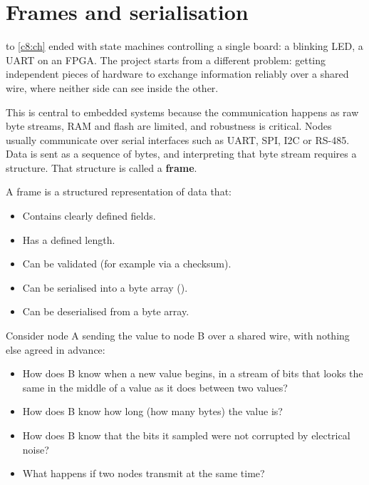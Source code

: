 
\section{Frames and serialisation}
\label{c10:sec:framing}

 to \ref{c8:ch} ended with state machines controlling a single board: a blinking LED,
a UART on an FPGA. The project starts from a different problem: getting independent pieces of
hardware to exchange information reliably over a shared wire, where neither side can see inside the
other.

This is central to embedded systems because the communication happens as raw byte streams, RAM and
flash are limited, and robustness is critical. Nodes usually communicate over serial interfaces such
as UART, SPI, I2C or RS-485. Data is sent as a sequence of bytes, and interpreting that byte stream
requires a structure. That structure is called a \textbf{frame}.

A frame is a structured representation of data that:
\begin{itemize}
  \item Contains clearly defined fields.
  \item Has a defined length.
  \item Can be validated (for example via a checksum).
  \item Can be serialised into a byte array ().
  \item Can be deserialised from a byte array.
\end{itemize}

Consider node A sending the value  to node B over a shared wire, with nothing else agreed
in advance:
\begin{itemize}
  \item How does B know when a new value begins, in a stream of bits that looks the same in the
    middle of a value as it does between two values?
  \item How does B know how long (how many bytes) the value is?
  \item How does B know that the bits it sampled were not corrupted by electrical noise?
  \item What happens if two nodes transmit at the same time?
\end{itemize}

